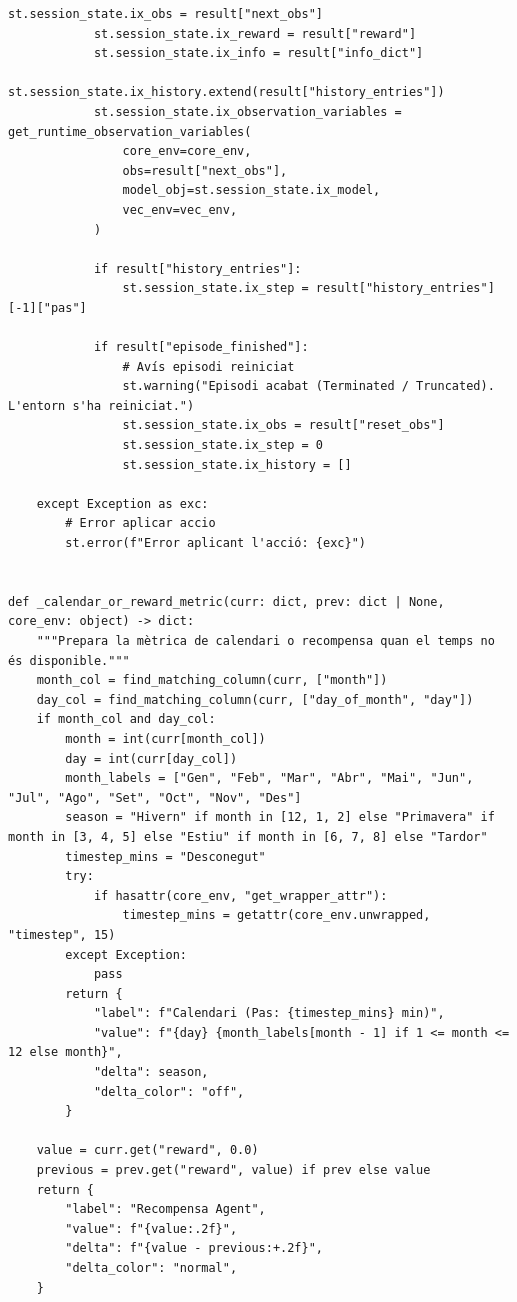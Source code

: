 \documentclass[10pt,a4paper]{article}
\begin{document}
\begin{lstlisting}[style=studioPython,caption={pages/Interaccionar\_amb\_l'Agent.py},label={lst:pages-interaccionar-amb-l-agent-py}]
            st.session_state.ix_obs = result["next_obs"]
            st.session_state.ix_reward = result["reward"]
            st.session_state.ix_info = result["info_dict"]
            st.session_state.ix_history.extend(result["history_entries"])
            st.session_state.ix_observation_variables = get_runtime_observation_variables(
                core_env=core_env,
                obs=result["next_obs"],
                model_obj=st.session_state.ix_model,
                vec_env=vec_env,
            )

            if result["history_entries"]:
                st.session_state.ix_step = result["history_entries"][-1]["pas"]

            if result["episode_finished"]:
                # Avís episodi reiniciat
                st.warning("Episodi acabat (Terminated / Truncated). L'entorn s'ha reiniciat.")
                st.session_state.ix_obs = result["reset_obs"]
                st.session_state.ix_step = 0
                st.session_state.ix_history = []

    except Exception as exc:
        # Error aplicar accio
        st.error(f"Error aplicant l'acció: {exc}")


def _calendar_or_reward_metric(curr: dict, prev: dict | None, core_env: object) -> dict:
    """Prepara la mètrica de calendari o recompensa quan el temps no és disponible."""
    month_col = find_matching_column(curr, ["month"])
    day_col = find_matching_column(curr, ["day_of_month", "day"])
    if month_col and day_col:
        month = int(curr[month_col])
        day = int(curr[day_col])
        month_labels = ["Gen", "Feb", "Mar", "Abr", "Mai", "Jun", "Jul", "Ago", "Set", "Oct", "Nov", "Des"]
        season = "Hivern" if month in [12, 1, 2] else "Primavera" if month in [3, 4, 5] else "Estiu" if month in [6, 7, 8] else "Tardor"
        timestep_mins = "Desconegut"
        try:
            if hasattr(core_env, "get_wrapper_attr"):
                timestep_mins = getattr(core_env.unwrapped, "timestep", 15)
        except Exception:
            pass
        return {
            "label": f"Calendari (Pas: {timestep_mins} min)",
            "value": f"{day} {month_labels[month - 1] if 1 <= month <= 12 else month}",
            "delta": season,
            "delta_color": "off",
        }

    value = curr.get("reward", 0.0)
    previous = prev.get("reward", value) if prev else value
    return {
        "label": "Recompensa Agent",
        "value": f"{value:.2f}",
        "delta": f"{value - previous:+.2f}",
        "delta_color": "normal",
    }



\end{lstlisting}
\end{document}
